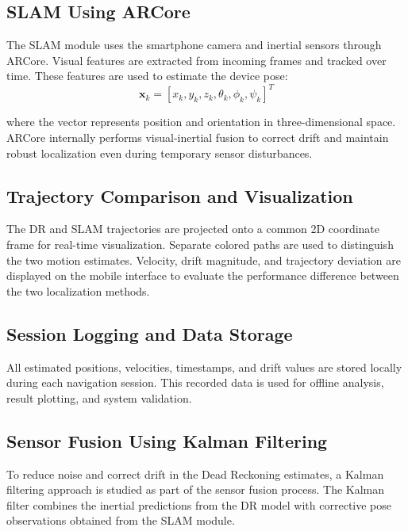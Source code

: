\documentclass[conference]{IEEEtran}
\begin{document}
\subsection{SLAM Using ARCore}

The SLAM module uses the smartphone camera and inertial sensors through ARCore. Visual features are extracted from incoming frames and tracked over time. These features are used to estimate the device pose:
\begin{equation}
\mathbf{x}_k = [x_k, y_k, z_k, \theta_k, \phi_k, \psi_k]^T
\end{equation}

where the vector represents position and orientation in three-dimensional space. ARCore internally performs visual-inertial fusion to correct drift and maintain robust localization even during temporary sensor disturbances.

\subsection{Trajectory Comparison and Visualization}

The DR and SLAM trajectories are projected onto a common 2D coordinate frame for real-time visualization. Separate colored paths are used to distinguish the two motion estimates. Velocity, drift magnitude, and trajectory deviation are displayed on the mobile interface to evaluate the performance difference between the two localization methods.

\subsection{Session Logging and Data Storage}

All estimated positions, velocities, timestamps, and drift values are stored locally during each navigation session. This recorded data is used for offline analysis, result plotting, and system validation.


\subsection{Sensor Fusion Using Kalman Filtering}

To reduce noise and correct drift in the Dead Reckoning estimates, a Kalman filtering approach is studied as part of the sensor fusion process. The Kalman filter combines the inertial predictions from the DR model with corrective pose observations obtained from the SLAM module.
\end{document}
